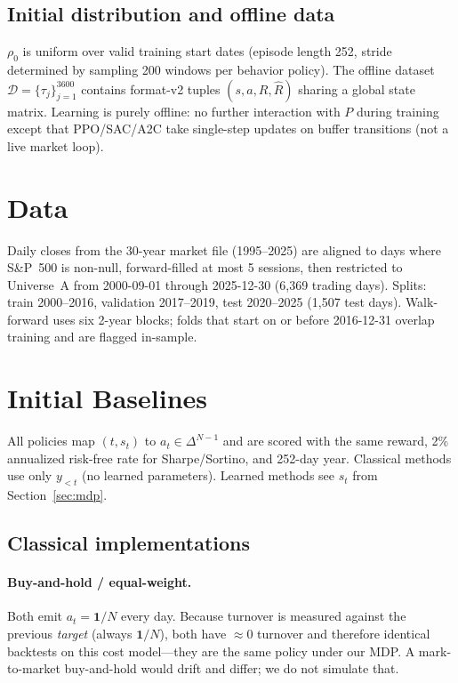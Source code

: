 \documentclass[11pt]{article}
\begin{document}
\subsection{Initial distribution and offline data}
$\rho_0$ is uniform over valid training start dates (episode length 252, stride determined by sampling 200 windows per behavior policy). The offline dataset $\mathcal{D}=\{\tau_j\}_{j=1}^{3600}$ contains format-v2 tuples $(s,a,R,\hat{R})$ sharing a global state matrix. Learning is purely offline: no further interaction with $P$ during training except that PPO/SAC/A2C take single-step updates on buffer transitions (not a live market loop).

\section{Data}
Daily closes from the 30-year market file (1995--2025) are aligned to days where S\&P~500 is non-null, forward-filled at most 5 sessions, then restricted to Universe~A from 2000-09-01 through 2025-12-30 (6{,}369 trading days). Splits: train 2000--2016, validation 2017--2019, test 2020--2025 (1{,}507 test days). Walk-forward uses six 2-year blocks; folds that start on or before 2016-12-31 overlap training and are flagged in-sample.

\section{Initial Baselines}
\label{sec:baselines}
All policies map $(t,s_t)$ to $a_t\in\Delta^{N-1}$ and are scored with the same reward, 2\% annualized risk-free rate for Sharpe/Sortino, and 252-day year. Classical methods use only $y_{<t}$ (no learned parameters). Learned methods see $s_t$ from Section~\ref{sec:mdp}.

\subsection{Classical implementations}
\paragraph{Buy-and-hold / equal-weight.}
Both emit $a_t=\mathbf{1}/N$ every day. Because turnover is measured against the previous \emph{target} (always $\mathbf{1}/N$), both have $\approx 0$ turnover and therefore identical backtests on this cost model---they are the same policy under our MDP. A mark-to-market buy-and-hold would drift and differ; we do not simulate that.
\end{document}
